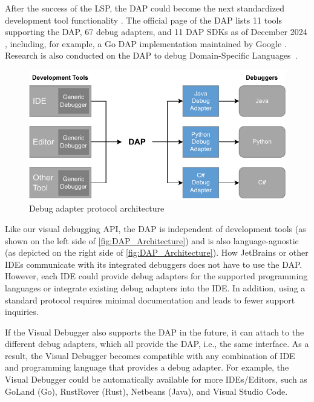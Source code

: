 \documentclass[sigconf]{acmart}
\begin{document}
After the success of the LSP, the DAP could become the next standardized development tool functionality \cite{raskVisualStudioCode2020,borkLanguageServerProtocol2023}.
The official page of the DAP lists 11 tools supporting the DAP, 67 debug adapters, and 11 DAP SDKs as of December 2024 \cite{microsoftDebugAdapterProtocol2023}, including, for example, a Go DAP implementation maintained by Google \cite{googleGoImplementationDebug2023}.
Research is also conducted on the DAP to debug Domain-Specific Languages~\cite{jeanjeanIDECodeReifying2021,enetProtocolBasedInteractiveDebugging2023}.

\begin{figure}[ht]
  \centering
  \includegraphics[width=1\linewidth]{images/visual-debugger-DAP-architecture.pdf}
  \caption{Debug adapter protocol architecture \cite{microsoftDebugAdapterProtocol2023}}
  \label{fig:DAP_Architecture}
\end{figure}

Like our visual debugging API, the DAP is independent of development tools (as shown on the left side of \autoref{fig:DAP_Architecture}) and is also language-agnostic (as depicted on the right side of \autoref{fig:DAP_Architecture}).
How JetBrains or other IDEs communicate with its integrated debuggers does not have to use the DAP.
However, each IDE could provide debug adapters for the supported programming languages or integrate existing debug adapters into the IDE.
In addition, using a standard protocol requires minimal documentation and leads to fewer support inquiries.

If the Visual Debugger also supports the DAP in the future, it can attach to the different debug adapters, which all provide the DAP, i.e., the same interface.
As a result, the Visual Debugger becomes compatible with any combination of IDE and programming language that provides a debug adapter.
For example, the Visual Debugger could be automatically available for more IDEs/Editors, such as GoLand (Go), RustRover (Rust), Netbeans (Java), and Visual Studio Code.
\end{document}
